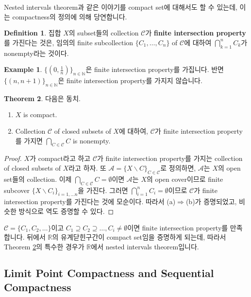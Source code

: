 \documentclass[12pt]{article}
\theoremstyle{definition}
\newtheorem{thm}{Theorem}[section]
\newtheorem{defn}[thm]{Definition}
\newtheorem*{ex}{Example}
\def\NN{\mathbb{N}}
\def\RR{\mathbb{R}}
\begin{document}
Nested intervals theorem과 같은 이야기를 compact set에 대해서도 할 수 있는데, 이는 compactness의 정의에 의해 당연합니다.

	\begin{defn}
		집합 \(X\)의 subset들의 collection \(\mathcal{C}\)가 \textbf{finite intersection property}를 가진다는 것은, 임의의 finite subcollection \(\{C_1, \ldots, C_n\}\) of \(\mathcal{C}\)에 대하여 \(\bigcap_{k=1}^n C_k\)가 nonempty라는 것이다.
	\end{defn}

	\begin{ex}
		\(\{(0, \frac{1}{n})\}_{n \in \NN}\)은 finite intersection property를 가집니다. 반면 \(\{(n, n+1)\}_{n \in \NN}\)은 finite intersection property를 가지지 않습니다.
	\end{ex}

	\begin{thm} \label{thm fip}
		다음은 동치.
		\begin{enumerate}[label=(\alph*), leftmargin=2\parindent]
			\item
			\(X\) is compact.
			\item
			Collection \(\mathcal{C}\) of closed subsets of \(X\)에 대하여, \(\mathcal{C}\)가 finite intersection property를 가지면 \(\bigcap_{C \in \mathcal{C}} C\) is nonempty.
		\end{enumerate}	
	\end{thm}

	\begin{proof}
		\(X\)가 compact라고 하고 \(\mathcal{C}\)가 finite intersection property를 가지는 collection of closed subsets of \(X\)라고 하자. 또 \(\mathcal{A} = \{X \backslash C\}_{C \in \mathcal{C}}\)로 정의하면, \(\mathcal{A}\)는 \(X\)의 open set들의 collection. 이제 \(\bigcap_{C \in \mathcal{C}} C = \emptyset\)이면 \(\mathcal{A}\)는 \(X\)의 open cover이므로 finite subcover \(\{X \backslash C_i\}_{i = 1, \ldots n}\)을 가진다. 그러면 \(\bigcap_{i=1}^n C_i = \emptyset\)이므로 \(\mathcal{C}\)가 finite intersection property를 가진다는 것에 모순이다. 따라서 (a)$\Rightarrow$(b)가 증명되었고, 비슷한 방식으로 역도 증명할 수 있다.
	\end{proof}

\(\mathcal{C} = \{C_1, C_2, \ldots\}\)이고 \(C_1 \supseteq C_2 \supseteq \ldots, C_i \neq \emptyset\)이면 finite intersection property를 만족합니다. 뒤에서 \(\RR\)의 유계닫힌구간이 compact set임을 증명하게 되는데, 따라서 Theorem \ref{thm fip}의 특수한 경우가 \(\RR\)에서 nested intervals theorem입니다. 

\subsection{Limit Point Compactness and Sequential Compactness} \label{sec lpc}
\end{document}
